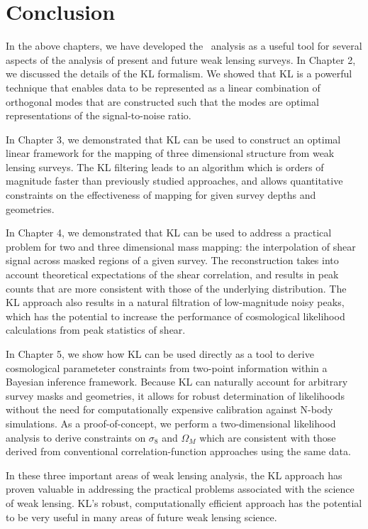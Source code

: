 \chapter{Conclusion}
In the above chapters, we have developed the \KL\ analysis as a useful tool
for several aspects of the analysis of present and future weak lensing
surveys.  In Chapter 2, we discussed the details of the KL formalism.
We showed that KL is a powerful technique that enables data to be represented
as a linear combination of orthogonal modes that are constructed such that
the modes are optimal representations of the signal-to-noise ratio.

In Chapter 3, we demonstrated that KL can be used to construct an optimal
linear framework for the mapping of three dimensional structure from weak
lensing surveys.  The KL filtering leads to an algorithm which is orders of
magnitude faster than previously studied approaches, and allows quantitative
constraints on the effectiveness of mapping for given survey depths and
geometries.

In Chapter 4, we demonstrated that KL can be used to address a practical problem
for two and three dimensional mass mapping: the interpolation of shear signal
across masked regions of a given survey.  The reconstruction takes into
account theoretical expectations of the shear correlation, and results in
peak counts that are more consistent with those of the underlying
distribution.  The KL approach also results in a natural filtration of
low-magnitude noisy peaks, which has the potential to increase the
performance of cosmological likelihood calculations from peak statistics
of shear.

In Chapter 5, we show how KL can be used directly as a tool to derive
cosmological parameteter constraints from two-point information within
a Bayesian inference framework. Because KL can naturally account for 
arbitrary survey masks and geometries, it allows for robust determination
of likelihoods without the need for computationally expensive calibration
against N-body simulations.
As a proof-of-concept, we perform a
two-dimensional likelihood analysis to derive constraints on $\sigma_8$
and $\Omega_M$ which are consistent with those derived from conventional
correlation-function approaches using the same data.

In these three important areas of weak lensing analysis, the KL approach
has proven valuable in addressing the practical problems associated with
the science of weak lensing.  KL's robust, computationally efficient approach
has the potential to be very useful in many areas of future weak lensing
science.


